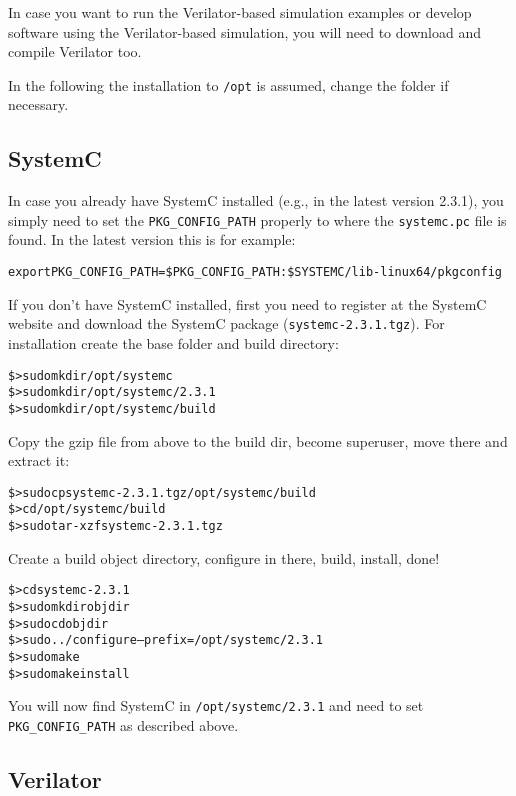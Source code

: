 In case you want to run the Verilator-based simulation examples or
develop software using the Verilator-based simulation, you will need
to download and compile Verilator too.

In the following the installation to \verb|/opt| is assumed, change
the folder if necessary.

\subsection{SystemC}

In case you already have SystemC installed (e.g., in the latest
version 2.3.1), you simply need to set the \verb|PKG_CONFIG_PATH|
properly to where the \verb|systemc.pc| file is found. In the latest
version this is for example:

\begin{alltt}
export PKG_CONFIG_PATH=\$PKG_CONFIG_PATH:\$SYSTEMC/lib-linux64/pkgconfig
\end{alltt}

If you don't have SystemC installed, first you need to register at the
SystemC website and download the SystemC package
(\verb|systemc-2.3.1.tgz|). For installation create the base folder
and build directory:

\begin{alltt}
\$> sudo mkdir /opt/systemc
\$> sudo mkdir /opt/systemc/2.3.1
\$> sudo mkdir /opt/systemc/build
\end{alltt}

Copy the gzip file from above to the build dir, become superuser, move
there and extract it:

\begin{alltt}
\$> sudo cp systemc-2.3.1.tgz /opt/systemc/build
\$> cd /opt/systemc/build
\$> sudo tar -xzf systemc-2.3.1.tgz
\end{alltt}

Create a build object directory, configure in there, build, install,
done!

\begin{alltt}
\$> cd systemc-2.3.1
\$> sudo mkdir objdir
\$> sudo cd objdir
\$> sudo ../configure --prefix=/opt/systemc/2.3.1
\$> sudo make
\$> sudo make install
\end{alltt}

You will now find SystemC in \verb|/opt/systemc/2.3.1| and need to set
\verb|PKG_CONFIG_PATH| as described above.

\subsection{Verilator}

